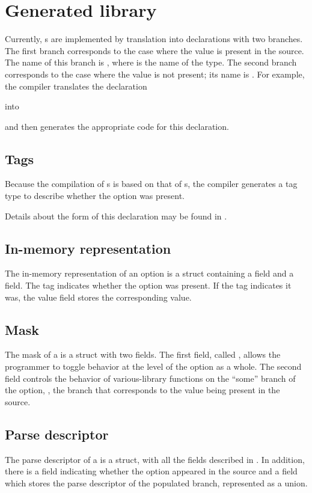 \section{Generated library}
\label{sec:opts-library}
Currently, \Popt{}s are implemented by translation into \Punion{}
declarations with two branches.  The first branch corresponds to the
case where the value is present in the source. The name of this branch
is , where  is the name of the \Popt{}
type.  The second branch corresponds to the case where the value is
not present; its name is .  For example, the
\pads{} compiler translates the \Popt{} declaration

into

and then generates the appropriate code for this declaration.

\subsection{Tags}
\label{sec:opts-tags}
Because the compilation of \Popt{}s is based on that of \Punion{}s,
the \pads{} compiler generates a tag type to describe whether the
option was present.  

Details about the form of this declaration may be found in
. 

\subsection{In-memory representation}
\label{sec:opts-rep}
The in-memory representation of an option is a \C{} struct containing
a  field and a  field.  The tag indicates whether the
option was present.  If the tag indicates it was, the value field
stores the corresponding value. 


\subsection{Mask}
\label{sec:opts-masks}
The mask of a \Popt{} is a \C{} struct with two fields.
The first field, called , allows the programmer to
toggle behavior at the level of the option as a whole.  The second
field controls the behavior of various-library functions on the
``some'' branch of the option, \ie{}, the branch that corresponds to
the value being present in the source.


\subsection{Parse descriptor}
\label{sec:opts-parse-descriptors}
The parse descriptor of a \Popt{} is a \C{} struct, with all
the fields described in . In
addition,  there is a  field indicating whether the option
appeared in the source and a  field which stores
the parse descriptor of the populated branch, represented as a \C{}
union. 


